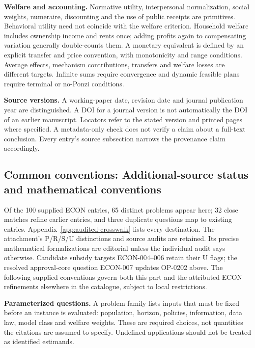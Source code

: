 \documentclass[11pt,a4paper]{article}
\begin{document}
\textbf{Welfare and accounting.} Normative utility, interpersonal normalization, social weights, numeraire, discounting and the use of public receipts are primitives. Behavioral utility need not coincide with the welfare criterion. Household welfare includes ownership income and rents once; adding profits again to compensating variation generally double-counts them. A monetary equivalent is defined by an explicit transfer and price convention, with monotonicity and range conditions. Average effects, mechanism contributions, transfers and welfare losses are different targets. Infinite sums require convergence and dynamic feasible plans require terminal or no-Ponzi conditions.

\textbf{Source versions.} A working-paper date, revision date and journal publication year are distinguished. A DOI for a journal version is not automatically the DOI of an earlier manuscript. Locators refer to the stated version and printed pages where specified. A metadata-only check does not verify a claim about a full-text conclusion. Every entry's source subsection narrows the provenance claim accordingly.

\subsection*{Common conventions: Additional-source status and mathematical conventions}

\label{audited:conventions}

Of the 100 supplied ECON entries, 65 distinct problems appear here; 32 close
matches refine earlier entries, and three duplicate questions map to existing
entries. Appendix~\ref{app:audited-crosswalk} lists every destination.
The attachment's P/R/S/U distinctions and source audits are retained. Its
precise mathematical formalizations are editorial unless the individual audit
says otherwise. Candidate subsidy targets ECON-004--006 retain their U flags;
the resolved approval-core question ECON-007 updates OP-0202 above.
The following supplied conventions govern both this part and the attributed
ECON refinements elsewhere in the catalogue, subject to local restrictions.

\textbf{Parameterized questions.} A problem family lists inputs that must be fixed before an instance is evaluated: population, horizon, policies, information, data law, model class and welfare weights. These are required choices, not quantities the citations are assumed to specify. Undefined applications should not be treated as identified estimands.
\end{document}
